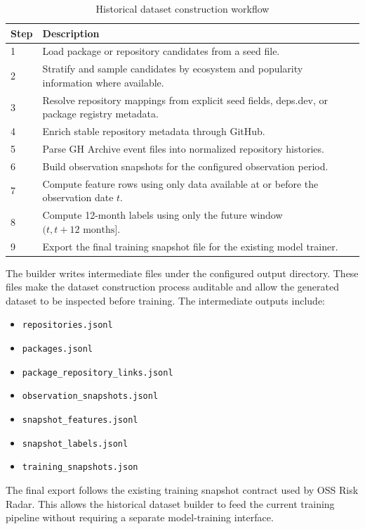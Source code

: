 \begin{table}[htbp]
\centering
\caption{Historical dataset construction workflow}
\label{tab:method-dataset-flow}
\begin{tabular}{p{} p{}}
\hline
\textbf{Step} & \textbf{Description} \\
\hline
1 & Load package or repository candidates from a seed file. \\
2 & Stratify and sample candidates by ecosystem and popularity information where available. \\
3 & Resolve repository mappings from explicit seed fields, deps.dev, or package registry metadata. \\
4 & Enrich stable repository metadata through GitHub. \\
5 & Parse GH Archive event files into normalized repository histories. \\
6 & Build observation snapshots for the configured observation period. \\
7 & Compute feature rows using only data available at or before the observation date \(t\). \\
8 & Compute 12-month labels using only the future window \((t, t + 12\text{ months}]\). \\
9 & Export the final training snapshot file for the existing model trainer. \\
\hline
\end{tabular}
\end{table}

The builder writes intermediate files under the configured output directory. These files make the dataset construction process auditable and allow the generated dataset to be inspected before training. The intermediate outputs include:

\begin{itemize}
    \item \texttt{repositories.jsonl}
    \item \texttt{packages.jsonl}
    \item \texttt{package\_repository\_links.jsonl}
    \item \texttt{observation\_snapshots.jsonl}
    \item \texttt{snapshot\_features.jsonl}
    \item \texttt{snapshot\_labels.jsonl}
    \item \texttt{training\_snapshots.json}
\end{itemize}

The final export follows the existing training snapshot contract used by OSS Risk Radar. This allows the historical dataset builder to feed the current training pipeline without requiring a separate model-training interface.


